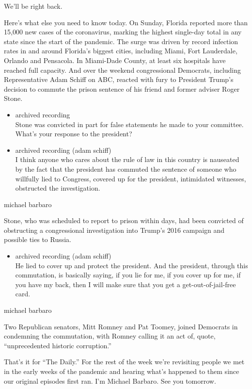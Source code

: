 We'll be right back.

Here's what else you need to know today. On Sunday, Florida reported
more than 15,000 new cases of the coronavirus, marking the highest
single-day total in any state since the start of the pandemic. The surge
was driven by record infection rates in and around Florida's biggest
cities, including Miami, Fort Lauderdale, Orlando and Pensacola. In
Miami-Dade County, at least six hospitals have reached full capacity.
And over the weekend congressional Democrats, including Representative
Adam Schiff on ABC, reacted with fury to President Trump's decision to
commute the prison sentence of his friend and former adviser Roger
Stone.

\begin{itemize}
\item
  archived recording\\
  Stone was convicted in part for false statements he made to your
  committee. What's your response to the president?
\item
  archived recording (adam schiff)\\
  I think anyone who cares about the rule of law in this country is
  nauseated by the fact that the president has commuted the sentence of
  someone who willfully lied to Congress, covered up for the president,
  intimidated witnesses, obstructed the investigation.
\end{itemize}

michael barbaro

Stone, who was scheduled to report to prison within days, had been
convicted of obstructing a congressional investigation into Trump's 2016
campaign and possible ties to Russia.

\begin{itemize}
\tightlist
\item
  archived recording (adam schiff)\\
  He lied to cover up and protect the president. And the president,
  through this commutation, is basically saying, if you lie for me, if
  you cover up for me, if you have my back, then I will make sure that
  you get a get-out-of-jail-free card.
\end{itemize}

michael barbaro

Two Republican senators, Mitt Romney and Pat Toomey, joined Democrats in
condemning the commutation, with Romney calling it an act of, quote,
``unprecedented historic corruption.''

That's it for ``The Daily.'' For the rest of the week we're revisiting
people we met in the early weeks of the pandemic and hearing what's
happened to them since our original episodes first ran. I'm Michael
Barbaro. See you tomorrow.

